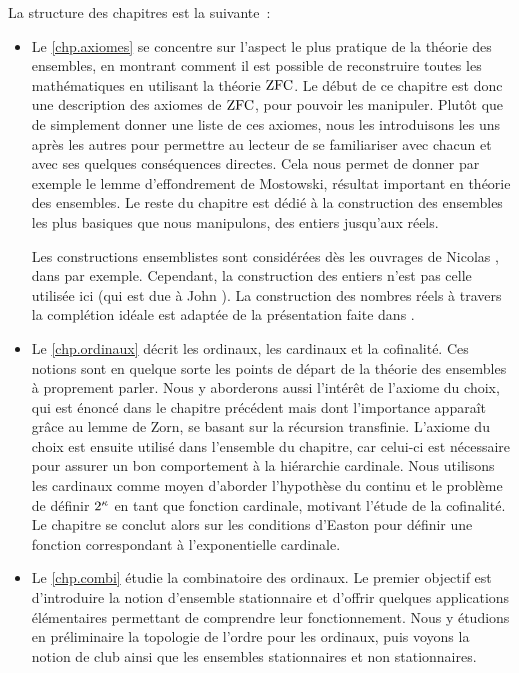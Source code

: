 La structure des chapitres est la suivante~:
\begin{itemize}
\item Le \cref{chp.axiomes} se concentre sur l'aspect le plus pratique de la
  théorie des ensembles, en montrant comment il est possible de reconstruire
  toutes les mathématiques en utilisant la théorie $\operatorname{ZFC}$. Le début de ce
  chapitre est donc une description des axiomes de $\operatorname{ZFC}$, pour pouvoir les
  manipuler. Plutôt que de simplement donner une liste de ces axiomes, nous les
  introduisons les uns après les autres pour permettre au lecteur de se
  familiariser avec chacun et avec ses quelques conséquences directes. Cela nous
  permet de donner par exemple le lemme d'effondrement de Mostowski,
  résultat important en théorie des ensembles. Le reste du chapitre est dédié à
  la construction des ensembles les plus basiques que nous manipulons, des
  entiers jusqu'aux réels.

  Les constructions ensemblistes sont considérées dès les ouvrages de Nicolas
  , dans \cite{Bourbaki2006Ensembles} par exemple. Cependant, la
  construction des entiers n'est pas celle utilisée ici (qui est due à
  John ). La construction des nombres réels à travers la
  complétion idéale est adaptée de la présentation faite dans
  \cite{AmadioCurien1998}.
  
\item Le \cref{chp.ordinaux} décrit les ordinaux, les cardinaux et la
  cofinalité. Ces notions sont en quelque sorte les points de départ de la
  théorie des ensembles à proprement parler. Nous y aborderons aussi l'intérêt
  de l'axiome du choix, qui est énoncé dans le chapitre précédent mais dont
  l'importance apparaît grâce au lemme de Zorn, se basant sur la
  récursion transfinie. L'axiome du choix est ensuite utilisé dans l'ensemble du
  chapitre, car celui-ci est nécessaire pour assurer un bon comportement à la
  hiérarchie cardinale. Nous utilisons les cardinaux comme moyen d'aborder
  l'hypothèse du continu et le problème de définir $2^{\kappa}$ en tant que
  fonction cardinale, motivant l'étude de la cofinalité. Le chapitre se conclut
  alors sur les conditions d'Easton pour définir une fonction correspondant à
  l'exponentielle cardinale.
  
\item Le \cref{chp.combi} étudie la combinatoire des ordinaux. Le premier
  objectif est d'introduire la notion d'ensemble stationnaire et d'offrir
  quelques applications élémentaires permettant de comprendre leur
  fonctionnement. Nous y étudions en préliminaire la topologie de l'ordre pour
  les ordinaux, puis voyons la notion de club ainsi que les ensembles
  stationnaires et non stationnaires.


\end{itemize}

